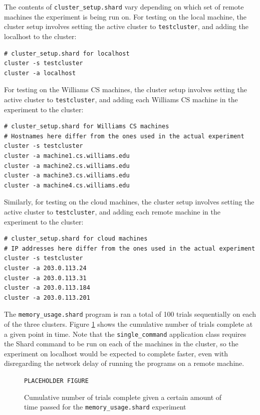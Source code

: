\documentclass[twoside]{report}
\begin{document}
The contents of \texttt{cluster\_setup.shard} vary depending on which set of remote machines the experiment is being run on.
For testing on the local machine, the cluster setup involves setting the active cluster to \texttt{testcluster}, and adding the localhost to the cluster:
\begin{lstlisting}[language=Shard]
# cluster_setup.shard for localhost
cluster -s testcluster
cluster -a localhost
\end{lstlisting}
For testing on the Williams CS machines, the cluster setup involves setting the active cluster to \texttt{testcluster}, and adding each Williams CS machine in the experiment to the cluster:
\begin{lstlisting}[language=Shard]
# cluster_setup.shard for Williams CS machines
# Hostnames here differ from the ones used in the actual experiment
cluster -s testcluster
cluster -a machine1.cs.williams.edu
cluster -a machine2.cs.williams.edu
cluster -a machine3.cs.williams.edu
cluster -a machine4.cs.williams.edu
\end{lstlisting}
Similarly, for testing on the cloud machines, the cluster setup involves setting the active cluster to \texttt{testcluster}, and adding each remote machine in the experiment to the cluster:
\begin{lstlisting}[language=Shard]
# cluster_setup.shard for cloud machines
# IP addresses here differ from the ones used in the actual experiment
cluster -s testcluster
cluster -a 203.0.113.24
cluster -a 203.0.113.31
cluster -a 203.0.113.184
cluster -a 203.0.113.201
\end{lstlisting}

The \texttt{memory\_usage.shard} program is ran a total of 100 trials sequentially on each of the three clusters.
Figure \ref{fig:memoryusage} shows the cumulative number of trials complete at a given point in time.
Note that the \texttt{single\_command} application class requires the Shard command to be run on each of the machines in the cluster, so the experiment on localhost would be expected to complete faster, even with disregarding the network delay of running the programs on a remote machine.

\begin{figure}[h]
  \begin{center}
    \vspace{2cm}
    \texttt{PLACEHOLDER FIGURE}
    \vspace{2cm}
    \caption{Cumulative number of trials complete given a certain amount of time passed for the \texttt{memory\_usage.shard} experiment}
    \label{fig:memoryusage}
  \end{center}
\end{figure}
\end{document}
